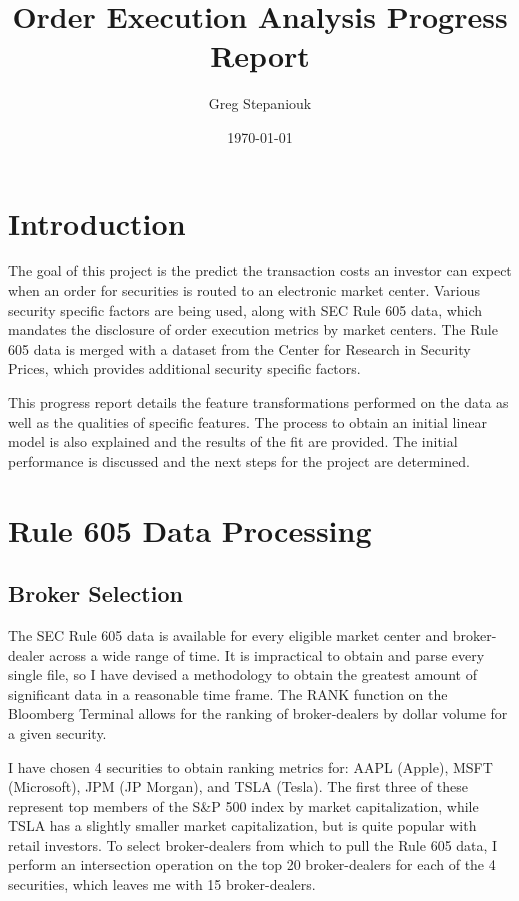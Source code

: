 \documentclass{article}
\title{Order Execution Analysis Progress Report}
\author{Greg Stepaniouk}
\date{\today}
\begin{document}
\maketitle

\begin{multicols}{2}
\section{Introduction}
\setlength{\parindent}{1cm}
The goal of this project is the predict the transaction costs an investor can expect when an order for securities is routed to an electronic market center. Various security specific factors are being used, along with SEC Rule 605 data, which mandates the disclosure of order execution metrics by market centers. The Rule 605 data is merged with a dataset from the Center for Research in Security Prices, which provides additional security specific factors.
\par This progress report details the feature transformations performed on the data as well as the qualities of specific features. The process to obtain an initial linear model is also explained and the results of the fit are provided. The initial performance is discussed and the next steps for the project are determined.

\section{Rule 605 Data Processing}
\setlength{\parindent}{1cm}
\subsection{Broker Selection}
\par
The SEC Rule 605 data is available for every eligible market center and broker-dealer across a wide range of time. It is impractical to obtain and parse every single file, so I have devised a methodology to obtain the greatest amount of significant data in a reasonable time frame. The RANK function on the Bloomberg Terminal allows for the ranking of broker-dealers by dollar volume for a given security. 
\par
\par
I have chosen 4 securities to obtain ranking metrics for: AAPL (Apple), MSFT (Microsoft), JPM (JP Morgan), and TSLA (Tesla). The first three of these represent top members of the S\&P 500 index by market capitalization, while TSLA has a slightly smaller market capitalization, but is quite popular with retail investors. To select broker-dealers from which to pull the Rule 605 data, I perform an intersection operation on the top 20 broker-dealers for each of the 4 securities, which leaves me with 15 broker-dealers. 
\par

\end{multicols}
\end{document}
